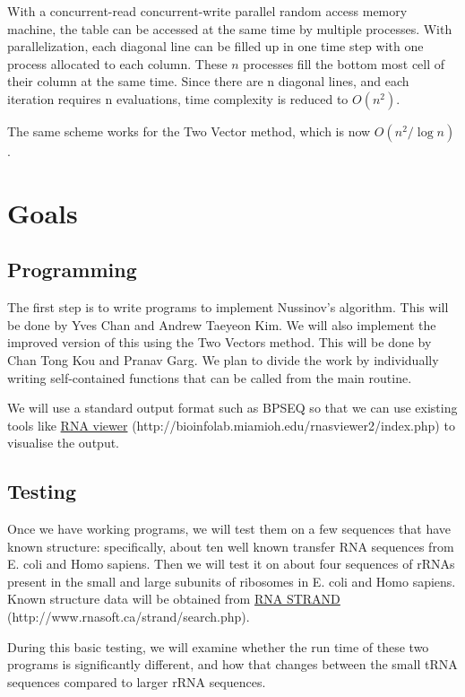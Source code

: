 \documentclass[11pt,a4paper]{article}
\begin{document}
With a concurrent-read concurrent-write parallel random access memory machine, the table can be accessed at the same time by multiple processes. With parallelization, each diagonal line can be filled up in one time step with one process allocated to each column. These $n$ processes fill the bottom most cell of their column at the same time. Since there are n diagonal lines, and each iteration requires n evaluations, time complexity is reduced to $O(n^2)$.

The same scheme works for the Two Vector method, which is now $O(n^2/\log n)$.

\section{Goals}
\subsection{Programming}

The first step is to write programs to implement Nussinov's algorithm. This will be done by Yves Chan and Andrew Taeyeon Kim. We will also implement the improved version of this using the Two Vectors method. This will be done by Chan Tong Kou and Pranav Garg. We plan to divide the work by individually writing self-contained functions that can be called from the main routine.

We will use a standard output format such as BPSEQ so that we can use existing tools like \href{http://bioinfolab.miamioh.edu/rnasviewer2/index.php}{RNA viewer} (http://bioinfolab.miamioh.edu/rnasviewer2/index.php) to visualise the output.

\subsection{Testing}

Once we have working programs, we will test them on a few sequences that have known structure: specifically, about ten well known transfer RNA sequences from E. coli and Homo sapiens. Then we will test it on about four sequences of rRNAs present in the small and large subunits of ribosomes in E. coli and Homo sapiens. Known structure data will be obtained from \href{http://www.rnasoft.ca/strand/search.php}{RNA STRAND} (http://www.rnasoft.ca/strand/search.php).

During this basic testing, we will examine whether the run time of these two programs is significantly different, and how that changes between the small tRNA sequences compared to larger rRNA sequences.
\end{document}
